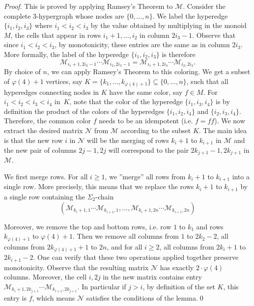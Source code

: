 \documentclass[envcountsame]{llncs}
\newcommand\mat{\ensuremath{\mathscr{M}}\xspace}
\newcommand\mnat{\ensuremath{\mathscr{N}}\xspace}
\newcommand{\sic}[1]{\ensuremath{\Sigma_{#1}}\xspace}
\let\geq\geqslant
\newcommand\qchain[1]{\ensuremath{\sic{#1}}-chain\xspace}
\newcommand\dchain{\qchain{2}}
\begin{document}
\begin{proof}
  This is proved by applying Ramsey's Theorem to \mat. Consider the
  complete 3-hypergraph whose nodes are $\{0,\ldots,n\}$. We label the
  hyperedge $\{i_1,i_2,i_3\}$ where $i_1 < i_2 < i_3$  by the value obtained by
  multiplying in the monoid $M$, the cells that appear in rows
  $i_1+1,\ldots,i_2$ in column $2i_3-1$. Observe that since $i_1 < i_2 < i_3$, by monotonicity, these entries are the
  same as in column $2i_3$. More formally, the label of the hyperedge $\{i_1,i_2,i_3\}$ is therefore
  \[
  \mat_{i_1+1,2i_3-1} \cdots \mat_{i_2,2i_3-1} = \mat_{i_1+1,2i_3} \cdots \mat_{i_2,2i_3}.
  \]
  By choice of $n$, we can apply Ramsey's Theorem to this coloring. We get a
  subset of $\varphi(4)+1$ vertices, say $K = \{k_1,\ldots,k_{\varphi(4)+1}\} \subseteq
  \{0,\ldots,n\}$, such that all hyperedges connecting nodes in $K$ have the same
  color, say $f \in M$. For $i_1<i_2<i_3<i_4$ in~$K$, note that the color of the hyperedge
  $\{i_1,i_3,i_4\}$ is by definition the product of the colors of the hyperedges 
  $\{i_1,i_2,i_4\}$ and $\{i_2,i_3,i_4\}$. Therefore, the common color $f$ needs to be an idempotent
  (i.e. $f = ff$). We now extract the desired matrix \mnat from \mat according
  to the subset $K$. The main idea is that the new row $i$ in \mnat will be the
  merging of rows $k_{i}+1$ to $k_{i+1}$ in \mat and the new pair of columns
  $2j-1,2j$ will correspond to the pair $2k_{j+1}-1,2k_{j+1}$ in \mat.

  We first merge rows. For all $i \geq 1$, we ''merge'' all rows from
  $k_{i}+1$ to $k_{i+1}$ into a single row. More precisely, this means
  that we replace the rows $k_{i}+1$ to $k_{i+1}$ by a single row
  containing the \dchain 
  \[
  (\mat_{k_{i}+1,1} \cdots \mat_{k_{i+1},1},\ldots,\mat_{k_{i}+1,2n} \cdots \mat_{k_{i+1},2n})
  \]

  Moreover, we remove the top and bottom rows, i.e. row $1$ to $k_1$ and
  rows $k_{\varphi(4)+1}$ to $\varphi(4)+1$. Then we remove all columns from $1$ to
  $2k_2 -2$, all columns from $2k_{\varphi(4)+1} + 1$ to $2n$, and for all $i
  \geq 2$, all columns from $2k_i+1$ to $2k_{i+1}-2$. One can verify
  that these two operations applied together preserve
  monotonicity. Observe that the resulting matrix \mnat has exactly
  $2\cdot \varphi(4)$ columns. Moreover, the cell $i,2j$ in the new
  matrix contains entry $\mat_{k_{i}+1,2k_{j+1}} \cdots
  \mat_{k_{i+1},2k_{j+1}}$. In particular if $j > i$, by definition of
  the set $K$, this entry is $f$, which means \mnat satisfies the
  conditions of the lemma.\qed
\end{proof}
\end{document}
